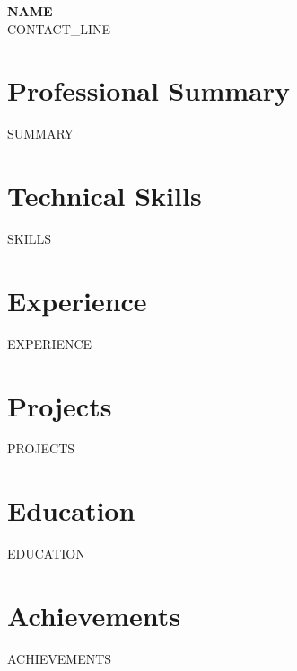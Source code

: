 \documentclass[9.5pt,letterpaper]{article}
\begin{document}
\begin{center}
  {\Large \textbf{{{NAME}}}} \\[2pt]
  \small
  {{CONTACT_LINE}}
\end{center}

\vspace{-10pt}

\section*{Professional Summary}
{{SUMMARY}}

\section*{Technical Skills}
\begin{rsitems}
{{SKILLS}}
\end{rsitems}

\section*{Experience}
{{EXPERIENCE}}

\section*{Projects}
{{PROJECTS}}

\section*{Education}
{{EDUCATION}}

\section*{Achievements}
\begin{rsitems}
{{ACHIEVEMENTS}}
\end{rsitems}
\end{document}
